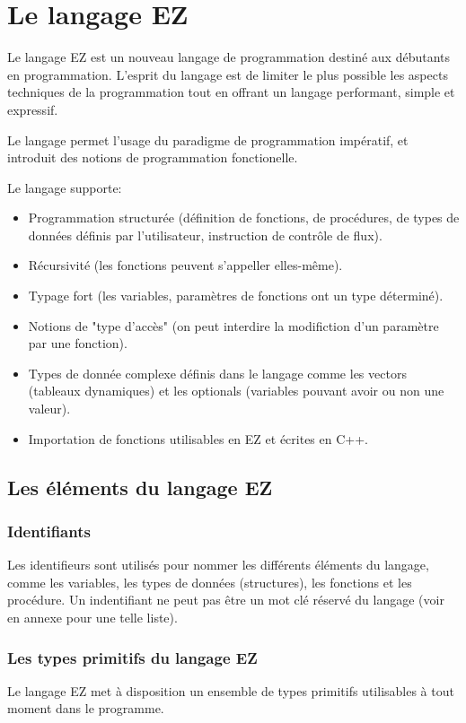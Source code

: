 \section{Le langage EZ}

Le langage EZ est un nouveau langage de programmation destiné aux débutants en
programmation.
L'esprit du langage est de limiter le plus possible les aspects techniques de
la programmation tout en offrant un langage performant, simple et expressif.

Le langage permet l'usage du paradigme de programmation impératif, et introduit
des notions de programmation fonctionelle.

Le langage supporte:
\begin{itemize}
    \item Programmation structurée (définition de fonctions, de procédures,
          de types de données définis par l'utilisateur, instruction de
          contrôle de flux).
    \item Récursivité (les fonctions peuvent s'appeller elles-même).
    \item Typage fort (les variables, paramètres de fonctions ont un type déterminé).
    \item Notions de "type d'accès" (on peut interdire la modifiction d'un
          paramètre par une fonction).
    \item Types de donnée complexe définis dans le langage comme les vectors
          (tableaux dynamiques) et les optionals
          (variables pouvant avoir ou non une valeur).
    \item Importation de fonctions utilisables en EZ et écrites en C++.
\end{itemize}

\subsection{Les éléments du langage EZ}

\subsubsection{Identifiants}
Les identifieurs sont utilisés pour nommer les différents éléments du langage,
comme les variables, les types de données (structures), les fonctions et les
procédure. Un indentifiant ne peut pas être un mot clé réservé du langage
(voir en annexe pour une telle liste).

\subsubsection{Les types primitifs du langage EZ}
Le langage EZ met à disposition un ensemble de types primitifs utilisables
à tout moment dans le programme.

